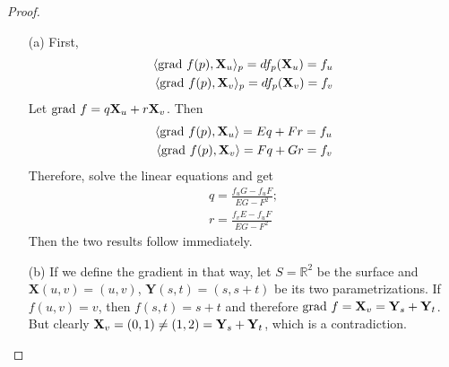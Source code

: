 \documentclass[10pt,a4paper]{article}
\begin{document}
\begin{proof}
\begin{enumerate}
\item[(a)]
First, 
\begin{align*}
\langle \textrm{grad } f(p), \mathbf{X}_u\rangle_p = df_p(\mathbf{X}_u) = f_u\\
\langle \textrm{grad } f(p), \mathbf{X}_v\rangle_p = df_p(\mathbf{X}_v) = f_v
\end{align*}
Let $\textrm{grad } f = q\mathbf{X}_u + r\mathbf{X}_v$. Then
\begin{align*}
\langle \textrm{grad } f(p), \mathbf{X}_u\rangle = Eq + Fr = f_u\\
\langle \textrm{grad } f(p), \mathbf{X}_v\rangle = Fq + Gr = f_v
\end{align*}
Therefore, solve the linear equations and get
\begin{align*}
q = \frac{f_uG - f_uF}{EG - F^2};\\
r = \frac{f_vE - f_uF}{EG - F^2}
\end{align*}
Then the two results follow immediately.
\item[(b)]
If we define the gradient in that way, let $S = \mathbb{R}^2$ be the surface and $\mathbf{X}(u, v) = (u, v)$, $\mathbf{Y}(s, t) = (s, s+t)$ be its two parametrizations. If $f(u, v) = v$, then $f(s, t) = s+t$ and therefore $\textrm{grad } f = \mathbf{X}_v = \mathbf{Y}_s + \mathbf{Y}_t$. But clearly $\mathbf{X}_v = (0, 1) \neq (1, 2) = \mathbf{Y}_s + \mathbf{Y}_t$, which is a contradiction.
\end{enumerate}
\end{proof}
\end{document}
